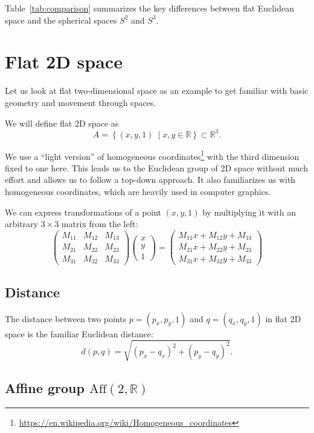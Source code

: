 \documentclass[twocolumn,10pt]{article}
\begin{document}
Table~\ref{tab:comparison} summarizes the key differences between flat Euclidean space and the spherical spaces $S^2$ and $S^3$.

\section{Flat 2D space}

Let us look at flat two-dimensional space as an example to get familiar with basic geometry and movement through spaces.

We will define flat 2D space as
\[
    A = \left\{ (x, y, 1) \ \mid x, y \in \mathbb{R} \right\} \subset \mathbb{R}^3.
\]

We use a ``light version'' of homogeneous coordinates\footnote{\url{https://en.wikipedia.org/wiki/Homogeneous_coordinates}} with the third dimension fixed to one here. This leads us to the Euclidean group of 2D space without much effort and allows us to follow a top-down approach. It also familiarizes us with homogeneous coordinates, which are heavily used in computer graphics.

We can express transformations of a point $(x, y, 1)$ by multiplying it with an arbitrary $3 \times 3$ matrix from the left:
\[
    \begin{pmatrix} M_{11} & M_{12} & M_{13} \\ M_{21} & M_{22} & M_{23} \\ M_{31} & M_{32} & M_{33}\end{pmatrix}
    \begin{pmatrix}x\\y\\1\end{pmatrix}
    = \begin{pmatrix}M_{11}x + M_{12}y + M_{13}\\M_{21}x + M_{22}y + M_{23}\\M_{31}x + M_{32}y + M_{33}\end{pmatrix}
\]

\subsection{Distance}

The distance between two points $p = (p_x, p_y, 1)$ and $q = (q_x, q_y, 1)$ in flat 2D space is the familiar Euclidean distance:
\[
    d(p, q) = \sqrt{(p_x - q_x)^2 + (p_y - q_y)^2}.
\]

\subsection{Affine group $\mathrm{Aff}(2, \mathbb{R})$}
\end{document}
